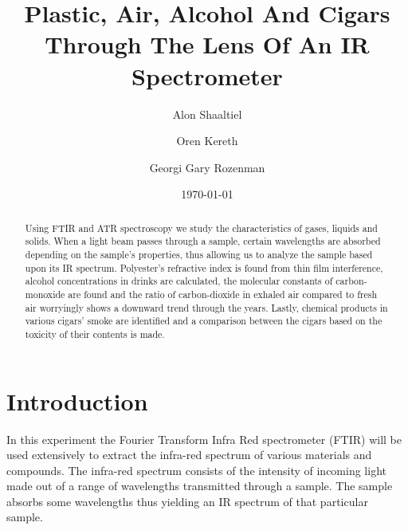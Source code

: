 \documentclass[reprint,amsmath,amssymb,aps, prl,superscriptaddress]{revtex4-2}
\begin{document}

\title{Plastic, Air, Alcohol And Cigars\\Through The Lens Of An IR Spectrometer}


\author{Alon Shaaltiel}
\author{Oren Kereth}
\author{Georgi Gary Rozenman}



\date{\today}%

\begin{abstract}
Using FTIR and ATR spectroscopy we study the characteristics of gases, liquids and solids. When a light beam passes through a sample, certain wavelengths are absorbed depending on the sample's properties, thus allowing us to analyze the sample based upon its IR spectrum. Polyester's refractive index is found from thin film interference, alcohol concentrations in drinks are calculated, the molecular constants of carbon-monoxide are found and the ratio of carbon-dioxide in exhaled air compared to fresh air worryingly shows a downward trend through the years. Lastly, chemical products in various cigars' smoke are identified and a comparison between the cigars based on the toxicity of their contents is made.
\end{abstract}

\maketitle
\renewcommand*{\thesection}{\arabic{section}}
\renewcommand*{\thesubsection}{\arabic{section}.\arabic{subsection}}

\section{Introduction}
In this experiment the Fourier Transform Infra Red spectrometer (FTIR) will be used extensively to extract the infra-red spectrum of various materials and compounds. The infra-red spectrum consists of the intensity of incoming light made out of a range of wavelengths transmitted through a sample. The sample absorbs some wavelengths thus yielding an IR spectrum of that particular sample.
\end{document}

